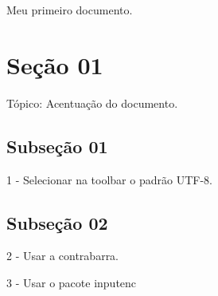 \documentclass{article}
\begin{document}
	Meu primeiro documento.
	
	\section{Seção 01}
	Tópico: Acentuação do documento.
	
	\subsection[Nem sei o que escrever aqui]{Subseção 01}
	1 - Selecionar na toolbar o padrão UTF-8.
	
	\subsection*{Subseção 02}
	2 - Usar a contrabarra.
	
	3 - Usar o pacote inputenc
	
\end{document}
